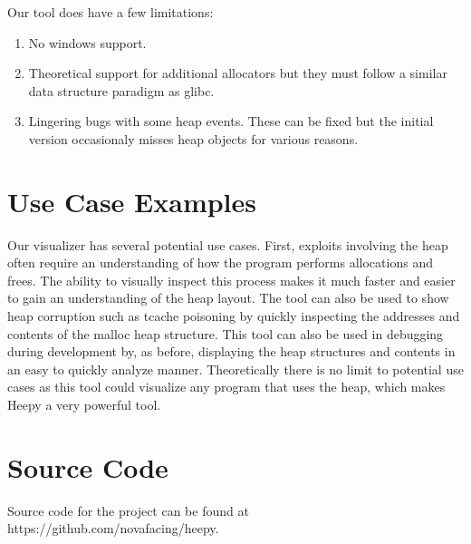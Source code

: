 \documentclass[12pt]{article}
\begin{document}
Our tool does have a few limitations: \\

\begin{enumerate}
    \item No windows support.
    \item Theoretical support for additional allocators but they must follow a similar data structure paradigm as glibc.
    \item Lingering bugs with some heap events. These can be fixed but the initial version occasionaly misses heap objects for various reasons.
\end{enumerate}

\section{Use Case Examples}

Our visualizer has several potential use cases. First, exploits involving the heap often require an understanding of how the program performs allocations and frees. The ability to visually inspect this process makes it much faster and easier to gain an understanding of the heap layout. The tool can also be used to show heap corruption such as tcache poisoning by quickly inspecting the addresses and contents of the malloc heap structure. This tool can also be used in debugging during development by, as before, displaying the heap structures and contents in an easy to quickly analyze manner. Theoretically there is no limit to potential use cases as this tool could visualize any program that uses the heap, which makes Heepy a very powerful tool. \\

\section{Source Code}

Source code for the project can be found at https://github.com/novafacing/heepy.
\end{document}
